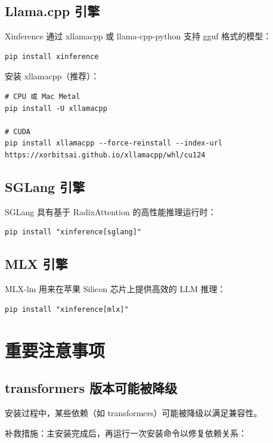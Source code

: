 \documentclass[12pt,UTF8]{ctexbook}
\begin{document}
\subsection{Llama.cpp 引擎}

Xinference 通过 xllamacpp 或 llama-cpp-python 支持 gguf 格式的模型：

\begin{lstlisting}
pip install xinference
\end{lstlisting}

安装 xllamacpp（推荐）：

\begin{lstlisting}
# CPU 或 Mac Metal
pip install -U xllamacpp

# CUDA
pip install xllamacpp --force-reinstall --index-url https://xorbitsai.github.io/xllamacpp/whl/cu124
\end{lstlisting}

\subsection{SGLang 引擎}

SGLang 具有基于 RadixAttention 的高性能推理运行时：

\begin{lstlisting}
pip install "xinference[sglang]"
\end{lstlisting}

\subsection{MLX 引擎}

MLX-lm 用来在苹果 Silicon 芯片上提供高效的 LLM 推理：

\begin{lstlisting}
pip install "xinference[mlx]"
\end{lstlisting}

\section{重要注意事项}
\label{sec:installation_notes}

\subsection{transformers 版本可能被降级}

安装过程中，某些依赖（如 transformers）可能被降级以满足兼容性。

补救措施：主安装完成后，再运行一次安装命令以修复依赖关系：
\end{document}
